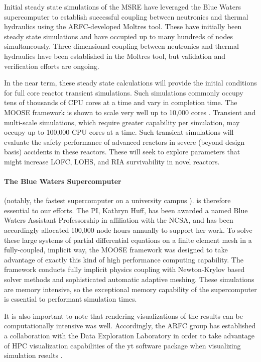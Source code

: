\documentclass[11pt]{article}
\begin{document}
Initial steady state simulations of the \gls{MSRE} have leveraged the Blue Waters 
supercomputer to establish successful coupling between neutronics and thermal 
hydraulics using the \gls{ARFC}-developed Moltres tool. 
These have initially been steady state simulations and have occupied up to many hundreds of nodes
simultaneously. Three dimensional coupling between neutronics and thermal hydraulics have been
established in the Moltres tool, but validation and verification efforts are
ongoing.


In the near term, these steady state calculations will provide the initial
conditions for full core reactor transient simulations. Such simulations
commonly occupy tens of thousands of CPU cores at a time and vary in completion
time. The MOOSE framework is shown to scale very well up to 10,000 cores 
\cite{gaston_moose:_2009}.
Transient and multi-scale simulations, which require greater capability per
simulation, may occupy up to 100,000 CPU cores at a time. Such transient
simulations will evaluate the safety performance of advanced reactors in severe
(beyond design basis) accidents in these reactors. These will seek to explore 
parameters that might increase \gls{LOFC}, \gls{LOHS}, and \gls{RIA} 
survivability in novel reactors.

\paragraph{The Blue Waters Supercomputer} (notably, the fastest supercomputer 
on a university campus \cite{ncsa_about_2017}).  is therefore essential to our 
efforts. The PI, Kathryn Huff, has been awarded a named Blue Waters Assistant 
Professorship in affiliation with the \gls{NCSA}, and has been accordingly 
allocated 100,000 node hours annually to support her work.  To solve these 
large systems of partial differential equations on a finite element mesh in a 
fully-coupled, implicit way, the MOOSE framework was designed to take advantage 
of exactly this kind of high performance computing capability.  The framework 
conducts fully implicit physics coupling with Newton-Krylov based solver 
methods and sophisticated automatic adaptive meshing.  These simulations are 
memory intensive, so the exceptional memory capability of the 
supercomputer is essential to performant simulation times. 

It is also important to note that rendering visualizations of the results can 
be computationally intensive was well. Accordingly, the \gls{ARFC} group has 
established a collaboration with the Data Exploration Laboratory 
\cite{turk_data_2017} in order to 
take advantage of HPC visualization capabilities of the yt software package 
when visualizing simulation results \cite{turk_yt:_2011}. 
\end{document}
